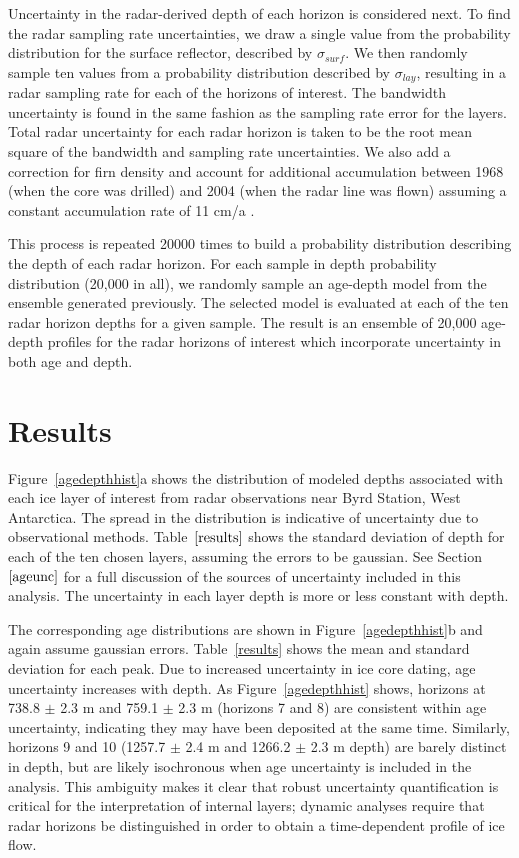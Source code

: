 \documentclass[12pt]{article}
\begin{document}
Uncertainty in the radar-derived depth of each horizon is considered next. To find the radar sampling rate uncertainties, we draw a single value from the probability distribution for the surface reflector, described by $\sigma_{surf}$. We then randomly sample ten values from a probability distribution described by $\sigma_{lay}$, resulting in a radar sampling rate for each of the horizons of interest. The bandwidth uncertainty is found in the same fashion as the sampling rate error for the layers. Total radar uncertainty for each radar horizon is taken to be the root mean square of the bandwidth and sampling rate uncertainties. We also add a correction for firn density and account for additional accumulation between 1968 (when the core was drilled) and 2004 (when the radar line was flown) assuming a constant accumulation rate of 11 cm/a \cite{hammer94}. 

This process is repeated 20000 times to build a probability distribution describing the depth of each radar horizon. For each sample in depth probability distribution (20,000 in all), we randomly sample an age-depth model from the ensemble generated previously. The selected model is evaluated at each of the ten radar horizon depths for a given sample. The result is an ensemble of 20,000 age-depth profiles for the radar horizons of interest which incorporate uncertainty in both age and depth.



\section{Results}


Figure~\ref{agedepthhist}a shows the distribution of modeled depths associated with each ice layer of interest from radar observations near Byrd Station, West Antarctica. The spread in the distribution is indicative of uncertainty due to observational methods. Table~$\ref{results}$ shows the standard deviation of depth for each of the ten chosen layers, assuming the errors to be gaussian. See Section~$\ref{ageunc}$ for a full discussion of the sources of uncertainty included in this analysis. The uncertainty in each layer depth is more or less constant with depth. 

The corresponding age distributions are shown in Figure~\ref{agedepthhist}b and again assume gaussian errors. Table~\ref{results} shows the mean and standard deviation for each peak. Due to increased uncertainty in ice core dating, age uncertainty increases with depth. As Figure~\ref{agedepthhist} shows, horizons at 738.8 $\pm$ 2.3 m and 759.1 $\pm$ 2.3 m (horizons 7 and 8) are consistent within age uncertainty, indicating they may have been deposited at the same time. Similarly, horizons 9 and 10 (1257.7 $\pm$ 2.4 m and 1266.2 $\pm$ 2.3 m depth) are barely distinct in depth, but are likely isochronous when age uncertainty is included in the analysis.  This ambiguity makes it clear that robust uncertainty quantification is critical for the interpretation of internal layers; dynamic analyses require that radar horizons be distinguished in order to obtain a time-dependent profile of ice flow. 
\end{document}
